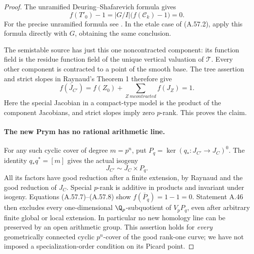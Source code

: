 \begin{proof}
The unramified Deuring--Shafarevich formula gives
\[
                  f(T'_0)-1
                    =|G/I|\bigl(f(\mathcal C_k)-1\bigr)=0.
                                                        \tag{A.57.6}
\]
For the precise unramified formula see
\cite[Corollary 1.8 and equation (1.8.2), printed pp.35--36]
{fghCrew1984}. In the etale case of (A.57.2), apply this
formula directly with \(G\), obtaining the same conclusion.

The semistable source has just this one noncontracted
component: its function field is the residue function field
of the unique vertical valuation of \(\mathcal T\).
Every other component is contracted to a point of the
smooth base. The tree assertion and strict slopes in
Raynaud's Theorem 1 therefore give
\[
           f(\overline J_{C'})=f(Z_0)+
                  \sum_{Z\ {
m contracted}}f(J_Z)=1.  \tag{A.57.7}
\]
Here the special Jacobian in a compact-type model is the
product of the component Jacobians, and strict slopes
imply zero \(p\)-rank. This proves the claim.

\paragraph{The new Prym has no rational arithmetic line.}
For any such cyclic cover of degree \(m=p^n\), put
\(P_q=\ker(q_*:J_{C'}\to J_C)^0\).
The identity \(q_*q^*=[m]\) gives the actual isogeny
\[
                           J_{C'}\sim J_C\times P_q.   \tag{A.57.8}
\]
All its factors have good reduction after a finite extension,
by Raynaud and the good reduction of \(J_C\). Special
\(p\)-rank is additive in products and invariant under
isogeny. Equations (A.57.7)--(A.57.8) show
\(f(\overline P_q)=1-1=0\).
Statement A.46 then excludes every one-dimensional
\(\Q_p\)-subquotient of \(V_pP_q\), even after arbitrary
finite global or local extension. In particular no new
homology line can be preserved by an open arithmetic group.
This assertion holds for \emph{every} geometrically connected
cyclic \(p^n\)-cover of the good rank-one curve; we have not
imposed a specialization-order condition on its Picard point.


\end{proof}
